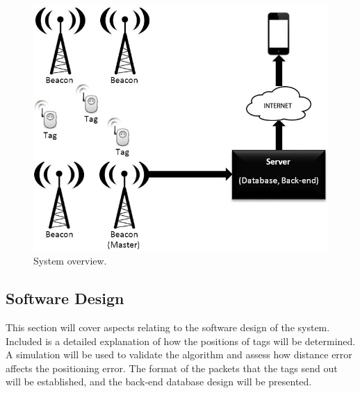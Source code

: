 \begin{figure}[H]
\begin{center}
\includegraphics[scale=0.7]{data/software/1.jpg}
\caption{System overview.}
\label{fig:soft-overview}
\end{center}
\end{figure}

\newpage
\subsection{Software Design}
This section will cover aspects relating to the software design of the system. Included is a detailed explanation of how the positions of tags will be determined. A simulation will be used to validate the algorithm and assess how distance error affects the positioning error. The format of the packets that the tags send out will be established, and the back-end database design will be presented.

